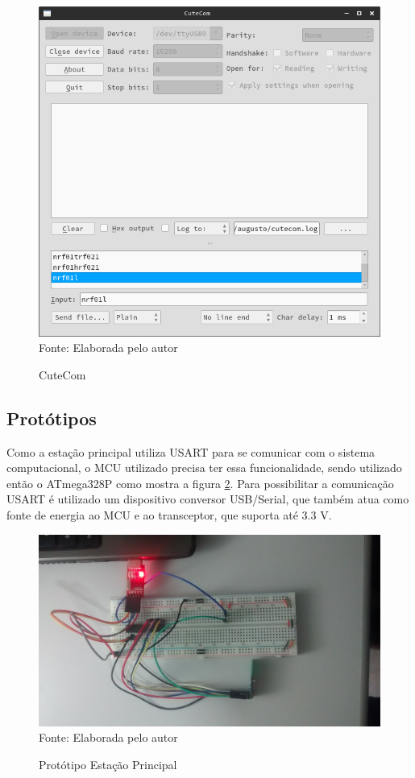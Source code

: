 {\begin{figure}[h!]
	\caption{CuteCom}
	\centering
	\includegraphics[scale=0.35]{../images/cutecom.png}
	\hspace{\linewidth}
	Fonte: Elaborada pelo autor
	\label{figura:cutecom}
\end{figure}

\subsection{Protótipos}
Como a estação principal utiliza USART para se comunicar com o sistema computacional, o MCU utilizado
precisa ter essa funcionalidade, sendo utilizado então o ATmega328P como mostra a figura
\ref{figura:prot_main}. Para possibilitar a comunicação USART é utilizado um dispositivo conversor USB/Serial,
que também atua como fonte de energia ao MCU e ao transceptor, que suporta até 3.3 V.

\begin{figure}[H]
	\caption{Protótipo Estação Principal}
	\centering
	\includegraphics[scale=0.1]{../images/prot_principal.jpg}
	\hspace{\linewidth}
	Fonte: Elaborada pelo autor
	\label{figura:prot_main}
\end{figure}

}
